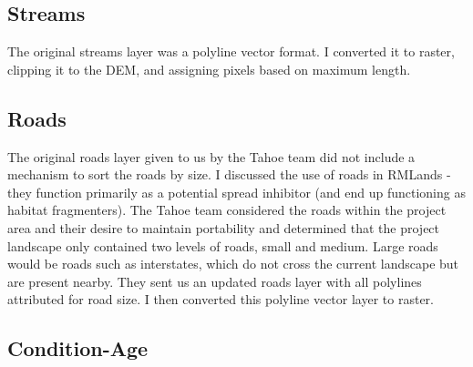 \subsection{Streams}
The original streams layer was a polyline vector format. I converted it to raster, clipping it to the DEM, and assigning pixels based on maximum length.

\subsection{Roads}
The original roads layer given to us by the Tahoe team did not include a mechanism to sort the roads by size. I discussed the use of roads in RMLands - they function primarily as a potential spread inhibitor (and end up functioning as habitat fragmenters). The Tahoe team considered the roads within the project area and their desire to maintain portability and determined that the project landscape only contained two levels of roads, small and medium. Large roads would be roads such as interstates, which do not cross the current landscape but are present nearby. They sent us an updated roads layer with all polylines attributed for road size. I then converted this polyline vector layer to raster.

\subsection{Condition-Age} 

